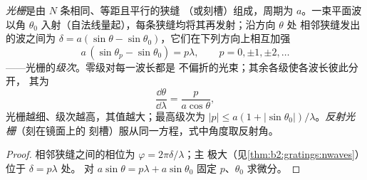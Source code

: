 \begin{proposition}[光栅方程]\label{prop:b2:gratings:equation}
\emph{光栅}是由 $N$ 条相同、等距且平行的狭缝
（或刻槽）组成，周期为 $a$。一束平面波以角 $\theta_0$
入射（自法线量起），每条狭缝均将其再发射；沿方向 $\theta$ 处
相邻狭缝发出的波之间为 $\delta = a(\sin\theta
- \sin\theta_0)$，它们在下列方向上相互加强
\[
a\,(\sin\theta_p - \sin\theta_0) = p\lambda , \qquad p = 0, \pm1, \pm2, \dots
\]
——光栅的\emph{级次}。零级对每一波长都是
不偏折的光束；其余各级使各波长彼此分开，
其\emph{}为
\[
\frac{\dd\theta}{\dd\lambda} = \frac{p}{a\cos\theta} ,
\]
光栅越细、级次越高，其值越大；最高级次为
$|p| \le a(1 + |\sin\theta_0|)/\lambda$。\emph{反射光栅}（刻在镜面上的
刻槽）服从同一方程，式中角度取反射角。
\end{proposition}

\begin{proof}
相邻狭缝之间的相位为 $\varphi = 2\pi\delta/\lambda$；主
极大（见\cref{thm:b2:gratings:nwaves}）位于 $\delta = p\lambda$ 处。
对 $a\sin\theta = p\lambda + a\sin\theta_0$ 固定 $p$、$\theta_0$ 求微分。
\end{proof}

